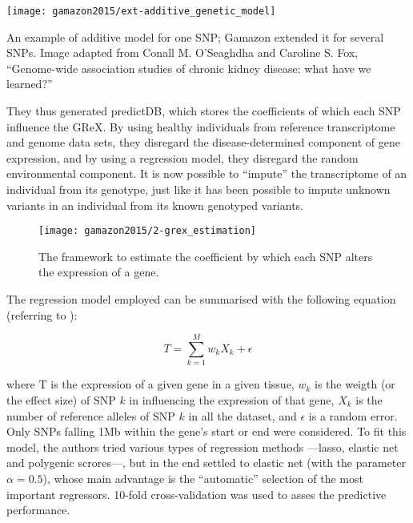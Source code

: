 \documentclass[../main.tex]{subfiles}
\begin{document}
\begin{marginfigure}
	\texttt{[image: gamazon2015/ext-additive\_genetic\_model]}
	\caption{An example of additive model for one SNP; Gamazon \etal 
extended it for several SNPs. Image adapted from Conall M. O'Seaghdha 
and Caroline S. Fox, \enquote{Genome-wide association studies of chronic 
kidney disease: what have we learned?}}
\end{marginfigure}

They thus generated predictDB, which stores the coefficients of which 
each SNP influence the GReX. By using healthy individuals from reference 
transcriptome and genome data sets, they disregard the 
disease-determined component of gene expression, and by using a 
regression model, they disregard the random environmental component. It 
is now possible to \enquote{impute} the transcriptome of an individual 
from its genotype, just like it has been possible to impute unknown 
variants in an individual from its known genotyped variants.

\begin{figure}
	\texttt{[image: gamazon2015/2-grex\_estimation]}
	\caption{The framework to estimate the coefficient by which each SNP 
alters the expression of a gene.}
\end{figure}

The regression model employed can be summarised with the following 
equation (referring to ):

\begin{equation}
	T = \sum_{k=1}^{M}w_k X_k + \epsilon
\end{equation}

where T is the expression of a given gene in a given tissue, $w_k$ is 
the weigth (or the effect size) of SNP $k$ in influencing the expression 
of that gene, $X_k$ is the number of reference alleles of SNP $k$ in all 
the dataset, and $\epsilon$ is a random error. Only SNPs falling 1Mb 
within the gene's start or end were considered. To fit this model, the 
authors tried various types of regression methods ---lasso, elastic net 
and polygenic scrores---, but in the end settled to elastic 
net (with the 
parameter $\alpha = 0.5$), whose main advantage is the 
\enquote{automatic} selection of the most important regressors. 10-fold 
cross-validation was used to asses the predictive performance.
\end{document}
